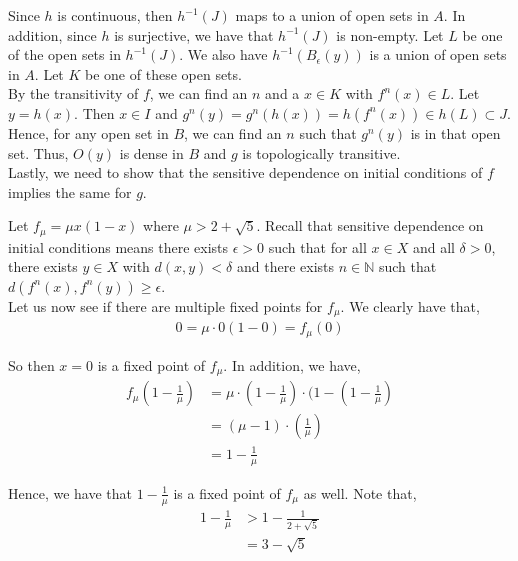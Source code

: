 \documentclass[12pt]{article}
\newenvironment{problem}[2][Problem]{\begin{trivlist}
\item[\hskip \labelsep {\bfseries #1}\hskip \labelsep {\bfseries #2.}]}{\end{trivlist}}
\begin{document}
Since $h$ is continuous, then $h^{-1}(J)$ maps to a union of open sets in $A$. In addition, since $h$ is surjective, we have that $h^{-1}(J)$ is non-empty. Let $L$ be one of the open sets in $h^{-1}(J)$. We also have $h^{-1}(B_{\epsilon}(y))$ is a union of open sets in $A$. Let $K$ be one of these open sets.\\

By the transitivity of $f$, we can find an $n$ and a $x \in K$ with $f^n(x) \in L$. Let $y = h(x)$. Then $x \in I$ and $g^n(y) = g^n(h(x)) = h(f^n(x)) \in h(L) \subset J$.\\

Hence, for any open set in $B$, we can find an $n$ such that $g^n(y)$ is in that open set. Thus, $O(y)$ is dense in $B$ and $g$ is topologically transitive.\\

Lastly, we need to show that the sensitive dependence on initial conditions of $f$ implies the same for $g$.

\begin{problem}{3}
\end{problem}

Let $f_{\mu} = \mu x(1-x)$ where $\mu > 2 + \sqrt{5}$. Recall that sensitive dependence on initial conditions means there exists $\epsilon > 0$ such that for all $x \in X$ and all $\delta > 0$, there exists $y \in X$ with $d(x,y) < \delta$ and there exists $n \in \mathbb{N}$ such that $d(f^n(x), f^n(y)) \geq \epsilon$.\\

Let us now see if there are multiple fixed points for $f_{\mu}$. We clearly have that,
\begin{align*}
0 = \mu \cdot 0(1 - 0) = f_{\mu}(0)
\end{align*}

So then $x = 0$ is a fixed point of $f_{\mu}$. In addition, we have,
\begin{align*}
f_{\mu}(1 - \frac{1}{\mu}) &= \mu \cdot (1 - \frac{1}{\mu}) \cdot (1 - (1 - \frac{1}{\mu})\\
&= (\mu - 1) \cdot (\frac{1}{\mu})\\
&= 1 - \frac{1}{\mu}
\end{align*}

Hence, we have that $1 - \frac{1}{\mu}$ is a fixed point of $f_{\mu}$ as well. Note that,
\begin{align*}
1 - \frac{1}{\mu} &> 1 - \frac{1}{2 + \sqrt{5}}\\
&= 3 - \sqrt{5}\\
\end{align*}
\end{document}
